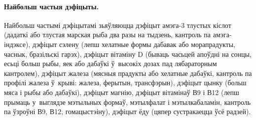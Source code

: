 \paragraph{Найбольш частыя дэфіцыты.}
Найбольш частымі дэфіцытамі зьяўляюцца дэфіцыт амэга-3 тлустых кіслот (дадаткі або тлустая марская рыба два разы на тыдзень, кантроль па амэга-індэксе), дэфіцыт сэлену (лепш хелатные формы дабавак або морапрадукты, часнык, бразільскі гарэх), дэфіцыт вітаміну D (бываць часьцей апоўдні на сонцы, есьці больш рыбы, яек або дабаўкі ў~высокіх дозах пад лябараторным кантролем), дэфіцыт жалеза (мясныя прадукты або хелатные дабаўкі, кантроль па профілі жалеза ў~крыві: жалеза, ферытын, трансфэрын), дэфіцыт цынку (больш мяса і рыбы або дабаўкі), дэфіцыт магнію, дэфіцыт вітамінаў В9 і В12 (лепш прымаць у~выглядзе мэтыльных формаў, мэтылфалат і мэтылкабаламін, кантроль па ўзроўні В9, В12, гомацыстэіну), дэфіцыт ёду (цяпер сустракаецца ўсё радзей).

